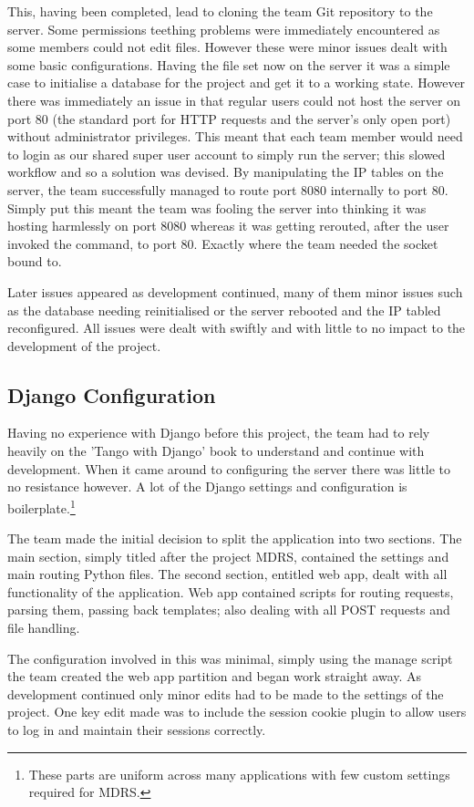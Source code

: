 \documentclass{l3proj}
\begin{document}
This, having been completed, lead to cloning the team Git repository to the server. Some permissions teething problems were immediately encountered as some members could not edit files. However these were minor issues dealt with some basic configurations.
Having the file set now on the server it was a simple case to initialise a database for the project and get it to a working state. However there was immediately an issue in that regular users could not host the server on port 80 (the standard port for HTTP requests and the server's only open port) without administrator privileges. This meant that each team member would need to login as our shared super user account to simply run the server; this slowed workflow and so a solution was devised. By manipulating the IP tables on the server, the team successfully managed to route port 8080 internally to port 80. Simply put this meant the team was fooling the server into thinking it was hosting harmlessly on port 8080 whereas it was getting rerouted, after the user invoked the command, to port 80. Exactly where the team needed the socket bound to.

Later issues appeared as development continued, many of them minor issues such as the database needing reinitialised or the server rebooted and the IP tabled reconfigured. All issues were dealt with swiftly and with little to no impact to the development of the project.

\subsection{Django Configuration}		Having no experience with Django before this project, the team had to rely heavily on the 'Tango with Django' book to understand and continue with development. When it came around to configuring the server there was little to no resistance however. A lot of the Django settings and configuration is boilerplate.\footnote{These parts are uniform across many applications with few custom settings required for MDRS.}

The team made the initial decision to split the application into two sections. The main section, simply titled after the project MDRS, contained the settings and main routing Python files. The second section, entitled web app, dealt with all functionality of the application. Web app contained scripts for routing requests, parsing them, passing back templates; also dealing with all POST requests and file handling.

The configuration involved in this was minimal, simply using the manage script the team created the web app partition and began work straight away. As development continued only minor edits had to be made to the settings of the project. One key edit made was to include the session cookie plugin to allow users to log in and maintain their sessions correctly.
\end{document}
